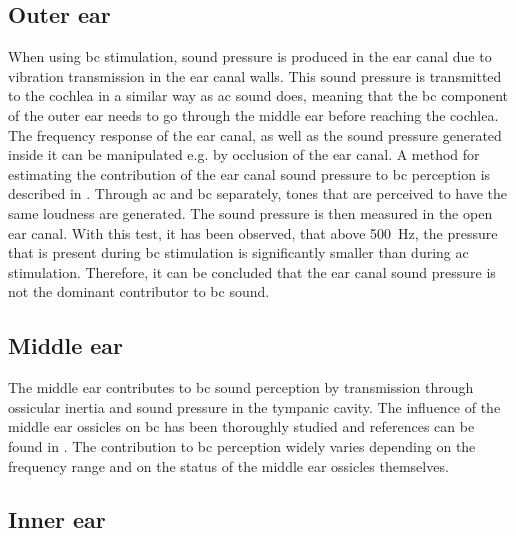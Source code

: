 \subsection*{Outer ear}

When using \gls{bc} stimulation, sound pressure is produced in the ear canal due to vibration transmission in the ear canal walls. This sound pressure is transmitted to the cochlea in a similar way as \gls{ac} sound does, meaning that the \gls{bc} component of the outer ear needs to go through the middle ear before reaching the cochlea. The frequency response of the ear canal, as well as the sound pressure generated inside it can be manipulated e.g. by occlusion of the ear canal. A method for estimating the contribution of the ear canal sound pressure to \gls{bc} perception is described in \citep{puria_2013}. Through \gls{ac} and \gls{bc} separately, tones that are perceived to have the same loudness are generated. The sound pressure is then measured in the open ear canal. With this test, it has been observed, that above \SI{500}{\hertz}, the pressure that is present during \gls{bc} stimulation is significantly smaller than during \gls{ac} stimulation. Therefore, it can be concluded that the ear canal sound pressure is not the dominant contributor to \gls{bc} sound.

\subsection*{Middle ear}

The middle ear contributes to \gls{bc} sound perception by transmission through ossicular inertia and sound pressure in the tympanic cavity. The influence of the middle ear ossicles on \gls{bc} has been thoroughly studied and references can be found in \citep[Sec. 6.5]{puria_2013}. The contribution to \gls{bc} perception widely varies depending on the frequency range and on the status of the middle ear ossicles themselves.

\subsection*{Inner ear}

